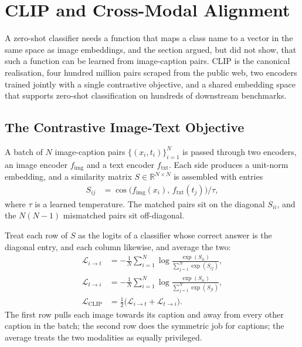 
\newpage
\section{CLIP and Cross-Modal Alignment}


 A zero-shot classifier needs a function that maps a class name to a vector in the same space as image embeddings, and the section argued, but did not show, that such a function can be learned from image-caption pairs. CLIP\cite{Radford2021CLIP} is the canonical realisation, four hundred million pairs scraped from the public web, two encoders trained jointly with a single contrastive objective, and a shared embedding space that supports zero-shot classification on hundreds of downstream benchmarks.

\subsection{The Contrastive Image-Text Objective}

 A batch of $N$ image-caption pairs $\{(x_i, t_i)\}_{i=1}^{N}$ is passed through two encoders, an image encoder $f_{\text{img}}$ and a text encoder $f_{\text{txt}}$. Each side produces a unit-norm embedding, and a similarity matrix $S \in \mathbb{R}^{N \times N}$ is assembled with entries
\begin{align*}
    S_{ij} &= \cos\bigl(f_{\text{img}}(x_i),\, f_{\text{txt}}(t_j)\bigr) / \tau,
\end{align*}
where $\tau$ is a learned temperature. The matched pairs sit on the diagonal $S_{ii}$, and the $N(N{-}1)$ mismatched pairs sit off-diagonal.

 Treat each row of $S$ as the logits of a classifier whose correct answer is the diagonal entry, and each column likewise, and average the two:
\begin{align*}
    \mathcal{L}_{i \to t} &= -\tfrac{1}{N} \sum_{i=1}^{N} \log \frac{\exp(S_{ii})}{\sum_{j=1}^{N} \exp(S_{ij})}, \\
    \mathcal{L}_{t \to i} &= -\tfrac{1}{N} \sum_{i=1}^{N} \log \frac{\exp(S_{ii})}{\sum_{j=1}^{N} \exp(S_{ji})}, \\
    \mathcal{L}_{\text{CLIP}} &= \tfrac{1}{2}\bigl(\mathcal{L}_{i \to t} + \mathcal{L}_{t \to i}\bigr).
\end{align*}
The first row pulls each image towards its caption and away from every other caption in the batch; the second row does the symmetric job for captions; the average treats the two modalities as equally privileged.


